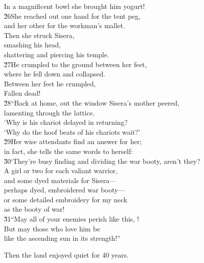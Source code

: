\begin{poetry}
\poemlll       In a magnificent bowl she brought him yogurt! \\
\poeml \v{26}She reached out one hand for the tent peg, \\
\poemll    and her other for the workman's mallet. \\
\poeml Then she struck Sisera, \\
\poemll    smashing his head, \\
\poemlll       shattering and piercing his temple. \\
\poeml \v{27}He crumpled to the ground between her feet, \\
\poemll    where he fell down and collapsed. \\
\poeml Between her feet he crumpled, \\
\poemll    Fallen dead! \\
\poeml \v{28}``Back at home, out the window Sisera's mother peered, \\
\poemll    lamenting through the lattice. \\
\poeml `Why is his chariot delayed in returning? \\
\poemll    `Why do the hoof beats of his chariots wait?' \\
\poeml \v{29}Her wise attendants find an answer for her; \\
\poemll    in fact, she tells the same words to herself: \\
\poeml \v{30}`They're busy finding and dividing the war booty, aren't they? \\
\poemll    A girl or two for each valiant warrior, \\
\poeml and some dyed materials for Sisera--- \\
\poemll    perhaps dyed, embroidered war booty--- \\
\poeml or some detailed embroidery for my neck \\
\poemll    as the booty of war! \\
\poeml \v{31}``May all of your enemies perish like this, ! \\
\poemll    But may those who love him be \\
\poemlll       like the ascending sun in its strength!''
\end{poetry}

Then the land enjoyed quiet for 40 years.


